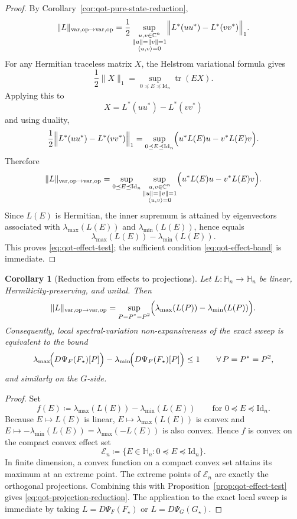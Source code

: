 \documentclass[11pt]{article}
\newcommand{\CC}{\mathbb{C}}
\newcommand{\Id}{\mathrm{Id}}
\newcommand{\tr}{\operatorname{tr}}
\newcommand{\eqdef}{\coloneqq}
\newcommand{\Hh}{\mathbb{H}}
\newcommand{\op}{\mathrm{op}}
\newcommand{\varop}{\mathrm{var},\op}
\theoremstyle{plain}
\newtheorem{corollary}[proposition]{Corollary}
\begin{document}
\begin{proof}
By Corollary~\ref{cor:qot-pure-state-reduction},
\[
\|L\|_{\varop\to\varop}
=
\frac12
\sup_{\substack{u,v\in \CC^n\\ \|u\|=\|v\|=1\\ \langle u,v\rangle=0}}
\Bigl\|
L^\ast(uu^\ast)-L^\ast(vv^\ast)
\Bigr\|_1.
\]
For any Hermitian traceless matrix $X$, the Helstrom variational formula gives
\[
\frac12\|X\|_1
=
\sup_{0\preceq E\preceq \Id_n}\tr(EX).
\]
Applying this to
\[
X=L^\ast(uu^\ast)-L^\ast(vv^\ast)
\]
and using duality,
\[
\frac12
\Bigl\|
L^\ast(uu^\ast)-L^\ast(vv^\ast)
\Bigr\|_1
=
\sup_{0\preceq E\preceq \Id_n}
\Bigl(
u^\ast L(E)u - v^\ast L(E)v
\Bigr).
\]
Therefore
\[
\|L\|_{\varop\to\varop}
=
\sup_{0\preceq E\preceq \Id_n}
\sup_{\substack{u,v\in \CC^n\\ \|u\|=\|v\|=1\\ \langle u,v\rangle=0}}
\Bigl(
u^\ast L(E)u - v^\ast L(E)v
\Bigr).
\]
Since $L(E)$ is Hermitian, the inner supremum is attained by eigenvectors associated with
$\lambda_{\max}(L(E))$ and $\lambda_{\min}(L(E))$, hence equals
\[
\lambda_{\max}(L(E))-\lambda_{\min}(L(E)).
\]
This proves \eqref{eq:qot-effect-test}; the sufficient condition \eqref{eq:qot-effect-band} is immediate.
\end{proof}

\begin{corollary}[Reduction from effects to projections]
\label{cor:qot-projection-reduction}
Let $L:\Hh_n\to\Hh_n$ be linear, Hermiticity-preserving, and unital.
Then
\begin{equation}
\label{eq:qot-projection-reduction}
\|L\|_{\varop\to\varop}
=
\sup_{\substack{P=P^\ast=P^2}}
\Bigl(\lambda_{\max}(L(P))-\lambda_{\min}(L(P))\Bigr).
\end{equation}
Consequently, local spectral-variation non-expansiveness of the exact sweep is equivalent to the bound
\[
\lambda_{\max}\!\Bigl(D\Psi_F(F_\star)[P]\Bigr)
-
\lambda_{\min}\!\Bigl(D\Psi_F(F_\star)[P]\Bigr)
\le 1
\qquad \forall\, P=P^\ast=P^2,
\]
and similarly on the $G$-side.
\end{corollary}

\begin{proof}
Set
\[
f(E)\eqdef \lambda_{\max}(L(E))-\lambda_{\min}(L(E))
\qquad \text{for } 0\preceq E\preceq \Id_n.
\]
Because $E\mapsto L(E)$ is linear, $E\mapsto \lambda_{\max}(L(E))$ is convex and
$E\mapsto -\lambda_{\min}(L(E))=\lambda_{\max}(-L(E))$ is also convex.
Hence $f$ is convex on the compact convex effect set
\[
\mathcal E_n \eqdef \{E\in \Hh_n : 0\preceq E\preceq \Id_n\}.
\]
In finite dimension, a convex function on a compact convex set attains its maximum at an extreme point.
The extreme points of $\mathcal E_n$ are exactly the orthogonal projections.
Combining this with Proposition~\ref{prop:qot-effect-test} gives \eqref{eq:qot-projection-reduction}.
The application to the exact local sweep is immediate by taking $L=D\Psi_F(F_\star)$ or $L=D\Psi_G(G_\star)$.
\end{proof}
\end{document}
